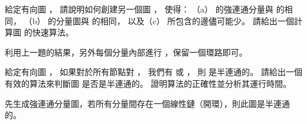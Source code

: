 \startEXERCISE
給定有向圖 ，
請說明如何創建另一個圖 ，
使得：
（a）  的強連通分量與  的相同，
（b）  的分量圖與  的相同，
以及（c）  所包含的邊儘可能少。
請給出一個計算圖  的快速算法。
\stopEXERCISE

\startANSWER
利用上一題的結果，另外每個分量內部進行 ，保留一個環路即可。
\stopANSWER

\startEXERCISE
給定有向圖 ，
如果對於所有節點對 ，
我們有  或 ，
則  是{\EMP 半連通}的。
請給出一個有效的算法來判斷圖  是否是半連通的。
證明算法的正確性並分析其運行時間。
\stopEXERCISE

\startANSWER
先生成強連通分量圖，若所有分量間存在一個線性鏈（開環），則此圖是半連通的。
\stopANSWER

\stopsection
